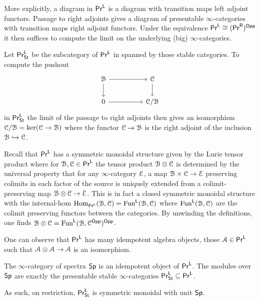 More explicitly, a diagram in $\mathsf{Pr}^{\mathsf{L}}$ is a diagram with transition maps left adjoint functors. Passage to right adjoints gives a diagram of presentable $\infty$-categories with transition maps right adjoint functors. Under the equivalence $\mathsf{Pr}^{\mathsf{L}}\cong(\mathsf{Pr}^{\mathsf{R}})^{\mathsf{Opp}}$ it then suffices to compute the limit on the underlying (big) $\infty$-categories. 
\begin{example}
    Let $\mathsf{Pr}^{\mathsf{L}}_{\mathsf{St}}$ be the subcategory of $\mathsf{Pr}^{\mathsf{L}}$ in  spanned by those stable categories. To compute the pushout 
    $$%
    \begin{tikzcd}
        \Bscr && \Cscr \\
        0 && {\Cscr/\Bscr}
        \arrow[from=1-1, to=1-3]
        \arrow[from=1-1, to=2-1]
        \arrow[from=1-3, to=2-3]
        \arrow[from=2-1, to=2-3]
    \end{tikzcd}$$
    in $\mathsf{Pr}^{\mathsf{L}}_{\mathsf{St}}$ the limit of the passage to right adjoints then gives an isomorphism $\EuScript{C}/\EuScript{B}=\ker(\EuScript{C}\to\EuScript{B})$ where the functor $\EuScript{C}\to\EuScript{B}$ is the right adjoint of the inclusion $\EuScript{B}\hookrightarrow\EuScript{C}$. 
\end{example}
Recall that $\mathsf{Pr}^{\mathsf{L}}$ has a symmetric monoidal structure given by the Lurie tensor product where for $\EuScript{B},\EuScript{C}\in\mathsf{Pr}^{\mathsf{L}}$ the tensor product $\EuScript{B}\otimes\EuScript{C}$ is determined by the universal property that for any $\infty$-category $\EuScript{E}$, a map $\EuScript{B}\times\EuScript{C}\to\EuScript{E}$ preserving colimits in each factor of the source is uniquely extended from a colimit-preserving map $\EuScript{B}\otimes\EuScript{C}\to\EuScript{E}$. This is in fact a closed symmetric monoidal structure with the internal-hom $\mathrm{Hom}_{\mathsf{Pr}^{\mathsf{L}}}(\EuScript{B},\EuScript{C})=\mathrm{Fun}^{\mathsf{L}}(\EuScript{B},\EuScript{C})$ where $\mathrm{Fun}^{\mathsf{L}}(\EuScript{B},\EuScript{C})$ are the colimit preserving functors between the categories. By unwinding the definitions, one finds $\EuScript{B}\otimes\EuScript{C}=\mathrm{Fun}^{\mathsf{L}}(\EuScript{B},\EuScript{C}^{\mathsf{Opp}})^{\mathsf{Opp}}$. 

One can observe that $\mathsf{Pr}^{\mathsf{L}}$ has many idempotent algebra objects, those $\EuScript{A}\in\mathsf{Pr}^{\mathsf{L}}$ such that $\EuScript{A}\otimes\EuScript{A}\to\EuScript{A}$ is an isomorphism. 
\begin{example}
    The $\infty$-category of spectra $\mathsf{Sp}$ is an idempotent object of $\mathsf{Pr}^{\mathsf{L}}$. The modules over $\mathsf{Sp}$ are exactly the presentable stable $\infty$-categories $\mathsf{Pr}^{\mathsf{L}}_{\mathsf{St}}\subseteq\mathsf{Pr}^{\mathsf{L}}$.
\end{example}
As such, on restriction, $\mathsf{Pr}^{\mathsf{L}}_{\mathsf{St}}$ is symmetric monoidal with unit $\mathsf{Sp}$. 


